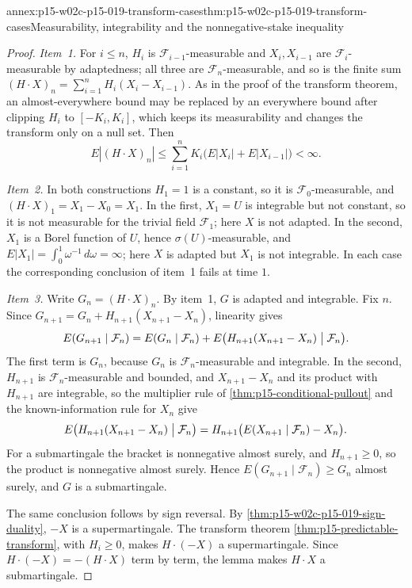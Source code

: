 \begin{annexitem}{annex:p15-w02c-p15-019-transform-cases}{thm:p15-w02c-p15-019-transform-cases}{Measurability, integrability and the nonnegative-stake inequality}
\begin{proof}
\emph{Item~1.} For \(i\leq n\), \(H_i\) is
\(\mathcal F_{i-1}\)-measurable and \(X_i,X_{i-1}\) are
\(\mathcal F_i\)-measurable by adaptedness; all three are
\(\mathcal F_n\)-measurable, and so is the finite sum
\((H\cdot X)_n=\sum_{i=1}^nH_i(X_i-X_{i-1})\). As in the proof of the
transform theorem, an almost-everywhere bound may be replaced by an
everywhere bound after clipping \(H_i\) to \([-K_i,K_i]\), which keeps
its measurability and changes the transform only on a null set. Then
\[
 E|(H\cdot X)_n|\leq\sum_{i=1}^nK_i\bigl(E|X_i|+E|X_{i-1}|\bigr)<\infty .
\]

\emph{Item~2.} In both constructions \(H_1=1\) is a constant, so it is
\(\mathcal F_0\)-measurable, and \((H\cdot X)_1=X_1-X_0=X_1\). In the
first, \(X_1=U\) is integrable but not constant, so it is not
measurable for the trivial field \(\mathcal F_1\); here \(X\) is not
adapted. In the second, \(X_1\) is a Borel function of \(U\), hence
\(\sigma(U)\)-measurable, and
\(E|X_1|=\int_0^1\omega^{-1}\,d\omega=\infty\); here \(X\) is adapted
but \(X_1\) is not integrable. In each case the corresponding
conclusion of item~1 fails at time \(1\).

\emph{Item~3.} Write \(G_n=(H\cdot X)_n\). By item~1, \(G\) is adapted
and integrable. Fix \(n\). Since \(G_{n+1}=G_n+H_{n+1}(X_{n+1}-X_n)\),
linearity gives
\[
 E(G_{n+1}\mid\mathcal F_n)
   =E(G_n\mid\mathcal F_n)+E\bigl(H_{n+1}(X_{n+1}-X_n)\bigm|\mathcal F_n\bigr).
\]
The first term is \(G_n\), because \(G_n\) is \(\mathcal F_n\)-measurable
and integrable. In the second, \(H_{n+1}\) is
\(\mathcal F_n\)-measurable and bounded, and \(X_{n+1}-X_n\) and its
product with \(H_{n+1}\) are integrable, so the multiplier rule of
\cref{thm:p15-conditional-pullout} and the known-information rule for
\(X_n\) give
\[
 E\bigl(H_{n+1}(X_{n+1}-X_n)\bigm|\mathcal F_n\bigr)
   =H_{n+1}\bigl(E(X_{n+1}\mid\mathcal F_n)-X_n\bigr).
\]
For a submartingale the bracket is nonnegative almost surely, and
\(H_{n+1}\geq0\), so the product is nonnegative almost surely. Hence
\(E(G_{n+1}\mid\mathcal F_n)\geq G_n\) almost surely, and \(G\) is a
submartingale.

The same conclusion follows by sign reversal. By
\cref{thm:p15-w02c-p15-019-sign-duality}, \(-X\) is a supermartingale.
The transform theorem \cref{thm:p15-predictable-transform}, with
\(H_i\geq0\), makes \(H\cdot(-X)\) a supermartingale. Since
\(H\cdot(-X)=-(H\cdot X)\) term by term, the lemma makes \(H\cdot X\) a
submartingale.
\end{proof}
\end{annexitem}

